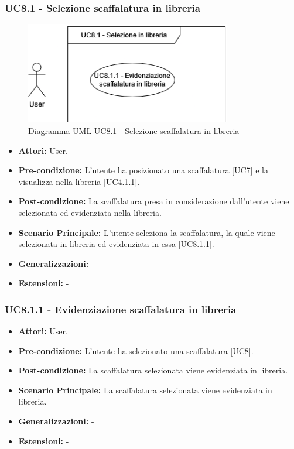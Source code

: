 \subsubsection{UC8.1 - Selezione scaffalatura in libreria}
\begin{figure}[H]
  \centering
  \includegraphics[width=0.8\textwidth]{UC_diagrams_1-10/UC8.1.drawio.png}
   \caption{Diagramma UML UC8.1 - Selezione scaffalatura in libreria}
\end{figure}
\begin{itemize}
    \item \textbf{Attori:} User.
    \item \textbf{Pre-condizione:} L'utente ha posizionato una scaffalatura [UC7] e la visualizza nella libreria [UC4.1.1].
    \item \textbf{Post-condizione:} La scaffalatura presa in considerazione dall'utente viene selezionata ed evidenziata nella libreria.
    \item \textbf{Scenario Principale:} L'utente seleziona la scaffalatura, la quale viene selezionata in libreria ed evidenziata in essa [UC8.1.1].
    \item \textbf{Generalizzazioni:} -
    \item \textbf{Estensioni:} -
\end{itemize}


\subsubsection{UC8.1.1 - Evidenziazione scaffalatura in libreria}
\begin{itemize}
    \item \textbf{Attori:} User.
    \item \textbf{Pre-condizione:} L'utente ha selezionato una scaffalatura [UC8].
    \item \textbf{Post-condizione:} La scaffalatura selezionata viene evidenziata in libreria.
    \item \textbf{Scenario Principale:} La scaffalatura selezionata viene evidenziata in libreria.
    \item \textbf{Generalizzazioni:} -
    \item \textbf{Estensioni:} -
\end{itemize}


